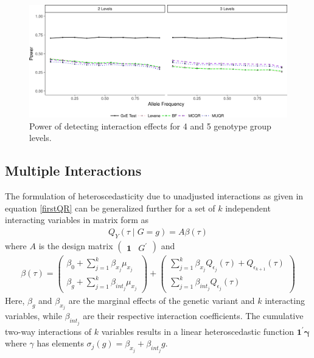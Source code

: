 \documentclass[12pt]{article}
\begin{document}
\begin{appendices}
\newpage
\begin{figure}[h!]
	\centering
	\includegraphics[width=0.8 \textwidth, height=0.45\textwidth]{Figures/power_nominal_cVar45.jpg}
	\caption{Power of detecting interaction effects for 4 and 5 genotype group levels.}
	\label{fig:PowLevel45}
\end{figure}

\newpage
\subsection{Multiple Interactions}
\indent \indent The formulation of heteroscedasticity due to unadjusted interactions as given in equation \ref{firstQR} can be generalized further for a set of $k$ independent interacting variables in matrix form as
\begin{equation}
\begin{split}
Q_Y (\tau \mid G=g) = A \beta (\tau)
\end{split}
\end{equation}
where $A$ is the design matrix $\begin{pmatrix} \bm{1} & G^{'} \end{pmatrix}$ and 
\begin{equation}
\begin{split}
\beta (\tau)=    
\begin{pmatrix}
\beta_0+ \sum_{j=1}^{k} \beta_{x_j}\mu_{x_j} \\
\beta_g + \sum_{j=1}^{k}\beta_{int_j}\mu_{x_j} 
\end{pmatrix} +
\begin{pmatrix}
\sum_{j=1}^{k} \beta_{x_j} Q_{\epsilon_{j}}(\tau) + Q_{\epsilon_{k+1}}(\tau) \\
\sum_{j=1}^{k} \beta_{int_j} Q_{\epsilon_{j}} (\tau) 
\end{pmatrix}
\end{split}
\end{equation}
Here, $\beta_g$ and $\beta_{x_{j}}$ are the marginal effects of the genetic variant and $k$ interacting variables, while $\beta_{int_j}$ are their respective interaction coefficients. The cumulative two-way interactions of $k$ variables results in a linear heteroscedastic function $\bm{1}^{'}\bm{\gamma}$ where $\gamma$ has elements $\sigma_j(g) = \beta_{x_j} +  \beta_{int_j} g$. 


\end{appendices}
\end{document}
